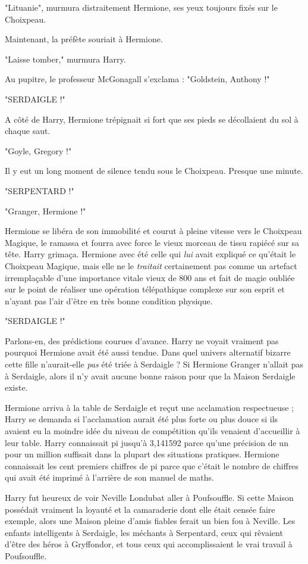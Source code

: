 "Lituanie", murmura distraitement Hermione, ses yeux toujours fixés sur le Choixpeau.

Maintenant, la préfète souriait à Hermione.

"Laisse tomber," murmura Harry.

Au pupitre, le professeur McGonagall s'exclama : "Goldstein, Anthony !"

"SERDAIGLE !"

A côté de Harry, Hermione trépignait si fort que ses pieds se décollaient du sol à chaque saut.

"Goyle, Gregory !"

Il y eut un long moment de silence tendu sous le Choixpeau. Presque une minute.

"SERPENTARD !"

"Granger, Hermione !"

Hermione se libéra de son immobilité et courut à pleine vitesse vers le Choixpeau Magique, le ramassa et fourra avec force le vieux morceau de tissu rapiécé sur sa tête. Harry grimaça. Hermione avec été celle qui \emph{lui}  avait expliqué ce qu'était le Choixpeau Magique, mais elle ne le \emph{traitait}  certainement pas comme un artefact irremplaçable d'une importance vitale vieux de 800 ans et fait de magie oubliée sur le point de réaliser une opération télépathique complexe sur son esprit et n'ayant pas l'air d'être en très bonne condition physique.

"SERDAIGLE !"

Parlons-en, des prédictions courues d'avance. Harry ne voyait vraiment pas pourquoi Hermione avait été aussi tendue. Dans quel univers alternatif bizarre cette fille n'aurait-elle \emph{pas}  été triée à Serdaigle ? Si Hermione Granger n'allait pas à Serdaigle, alors il n'y avait aucune bonne raison pour que la Maison Serdaigle existe.

Hermione arriva à la table de Serdaigle et reçut une acclamation respectueuse ; Harry se demanda si l'acclamation aurait été plus forte ou plus douce si ils avaient eu la moindre idée du niveau de compétition qu'ils venaient d'accueillir à leur table. Harry connaissait pi jusqu'à 3,141592 parce qu'une précision de un pour un million suffisait dans la plupart des situations pratiques. Hermione connaissait les cent premiers chiffres de pi parce que c'était le nombre de chiffres qui avait été imprimé à l'arrière de son manuel de maths.

Harry fut heureux de voir Neville Londubat aller à Poufsouffle. Si cette Maison possédait vraiment la loyauté et la camaraderie dont elle était censée faire exemple, alors une Maison pleine d'amis fiables ferait un bien fou à Neville. Les enfants intelligents à Serdaigle, les méchants à Serpentard, ceux qui rêvaient d'être des héros à Gryffondor, et tous ceux qui accomplissaient le vrai travail à Poufsouffle.

